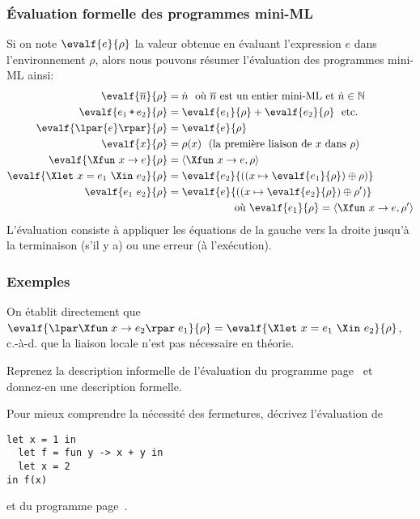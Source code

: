 %
\begin{frame}
\frametitle{Évaluation formelle des programmes mini-ML}

Si on note $\evalf{e}{\rho}$ la valeur obtenue en évaluant
l'expression $e$ dans l'environnement $\rho$, alors nous pouvons
résumer l'évaluation des programmes mini-ML ainsi:
\begin{align*}
\evalf{\overline{n}}{\rho} &= \dot{n} \ \ \textnormal{où $\overline{n}$
  est un entier mini-ML et $\dot{n} \in \mathbb{N}$}\\
\evalf{e_1 \, \texttt{+} \, e_2}{\rho} &= \evalf{e_1}{\rho} +
\evalf{e_2}{\rho} \ \ \textnormal{etc.}\\ 
\evalf{\lpar{e}\rpar}{\rho} &= \evalf{e}{\rho}\\
\evalf{x}{\rho} &= \rho(x) \ \ \textnormal{(la première liaison de $x$ dans $\rho$)}\\
\evalf{\Xfun \,\, x \rightarrow e}{\rho} &= \langle\Xfun \,\, x
\rightarrow e, \rho\rangle\\
\evalf{\Xlet \,\, x = e_1 \,\, \Xin \,\, e_2}{\rho} &= \evalf{e_2}{((x
  \mapsto \evalf{e_1}{\rho}) \oplus \rho)}\\
\evalf{e_1 \,\, e_2}{\rho} &= \evalf{e}{((x \mapsto \evalf{e_2}{\rho})
  \oplus \rho')}\\
&\phantom{=\llbracket} \textnormal{où} \ \evalf{e_1}{\rho} = \langle\Xfun \,\, x
\rightarrow e,\rho'\rangle
\end{align*}
L'évaluation consiste à appliquer les équations de la gauche vers la
droite jusqu'à la terminaison (s'il y a) ou une erreur (à
l'exécution).

\end{frame}

%
\begin{frame}[containsverbatim]
\frametitle{Exemples}

On établit directement que $\evalf{\lpar\Xfun \; x \rightarrow
e_2\rpar \; e_1}{\rho} = \evalf{\Xlet \,\, x = e_1 \,\, \Xin \,\,
e_2}{\rho}$,\\ c.-à-d. que la liaison locale n'est pas nécessaire en
théorie.

\bigskip

Reprenez la description informelle de l'évaluation du programme
page~\pageref{exemple_eval_informelle} et donnez-en une description
formelle.

\bigskip

Pour mieux comprendre la nécessité des fermetures, décrivez
l'évaluation de
{\small
\begin{verbatim}
let x = 1 in
  let f = fun y -> x + y in
  let x = 2
in f(x)
\end{verbatim}
}
et du programme page~\pageref{un_autre_programme}.

\end{frame}

